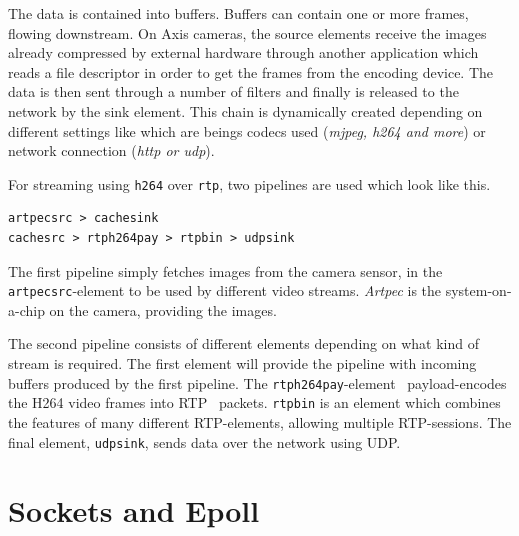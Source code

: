 \documentclass[nobiblatex]{LTHthesis}
\begin{document}

The data is contained into buffers. Buffers can contain one or more frames,
flowing downstream. On Axis cameras, the source elements receive the images
already compressed by external hardware through another application which
reads a file descriptor in order to get the frames from the encoding device.
The data is then sent through a number of filters and finally is released to
the network by the sink element. This chain is dynamically created depending
on different settings like which are beings codecs used (\emph{mjpeg, h264 and more}) or 
network connection (\emph{http or udp}).

For streaming using \texttt{h264} over \texttt{rtp}, two pipelines are used
which look like this.
\begin{verbatim}
artpecsrc > cachesink
cachesrc > rtph264pay > rtpbin > udpsink
\end{verbatim}
The first pipeline simply fetches images from the camera sensor, in the \texttt{artpecsrc}-element to be used by different video streams. \emph{Artpec} is the system-on-a-chip on the camera, providing the images.

The second pipeline consists of different elements depending on what kind of 
stream is required. The first element will provide the pipeline with incoming 
buffers produced by the first pipeline. The 
\texttt{rtph264pay}-element~\cite{gst-elements} payload-encodes the H264 video 
frames into RTP~\cite{rtp} packets. \texttt{rtpbin} is an element which 
combines the features of many different RTP-elements, allowing multiple 
RTP-sessions. The final element, \texttt{udpsink}, sends data over 
the network using UDP.

\section{Sockets and Epoll}
\end{document}

